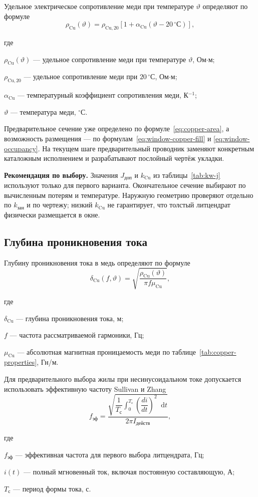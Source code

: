 \documentclass[14pt,a4paper]{extarticle}
\newcommand{\recommend}{\par\noindent\textbf{Рекомендация по выбору.} }
\newcommand{\dd}{\mathop{}\!\mathrm{d}}
\newenvironment{whereblock}
 {\par\noindent где\par
  \begin{list}{}{\setlength{\leftmargin}{12.5mm}
                  \setlength{\itemindent}{-12.5mm}
                  \setlength{\itemsep}{0pt}
                  \setlength{\parsep}{0pt}
                  \setlength{\topsep}{0pt}}}
 {\end{list}}
\newcommand{\whereitem}[2]{\item[] #1 --- #2}
\begin{document}
Удельное электрическое сопротивление меди при температуре $\vartheta$
определяют по формуле
\begin{equation}
 \rho_{\text{Cu}}(\vartheta)=
 \rho_{\text{Cu},20}
 \left[1+\alpha_{\text{Cu}}(\vartheta-20\,^{\circ}\text{С})\right],
 \label{eq:rho-temperature}
\end{equation}
\begin{whereblock}
\whereitem{$\rho_{\text{Cu}}(\vartheta)$}{удельное сопротивление меди при
температуре $\vartheta$, Ом$\cdot$м;}
\whereitem{$\rho_{\text{Cu},20}$}{удельное сопротивление меди при
$20\,^{\circ}\text{С}$, Ом$\cdot$м;}
\whereitem{$\alpha_{\text{Cu}}$}{температурный коэффициент сопротивления
меди, К$^{-1}$;}
\whereitem{$\vartheta$}{температура меди, $^{\circ}\text{С}$.}
\end{whereblock}

Предварительное сечение уже определено по
формуле~\eqref{eq:copper-area}, а возможность размещения --- по
формулам~\eqref{eq:window-copper-fill} и
\eqref{eq:window-occupancy}. На текущем шаге предварительный проводник
заменяют конкретным каталожным исполнением и разрабатывают послойный
чертёж укладки.

\recommend Значения $J_{\text{доп}}$ и $k_{\text{Cu}}$ из
таблицы~\ref{tab:kw-j} используют только
для первого варианта. Окончательное сечение выбирают по вычисленным
потерям и температуре. Наружную геометрию проверяют отдельно по
$k_{\text{зан}}$ и по чертежу; низкий $k_{\text{Cu}}$ не гарантирует,
что толстый литцендрат физически размещается в окне.

\subsection{Глубина проникновения тока}

Глубину проникновения тока в медь определяют по формуле
\begin{equation}
 \delta_{\text{Cu}}(f,\vartheta)=
 \sqrt{\frac{\rho_{\text{Cu}}(\vartheta)}
 {\pi f\mu_{\text{Cu}}}},
 \label{eq:skin-depth}
\end{equation}
\begin{whereblock}
\whereitem{$\delta_{\text{Cu}}$}{глубина проникновения тока, м;}
\whereitem{$f$}{частота рассматриваемой гармоники, Гц;}
\whereitem{$\mu_{\text{Cu}}$}{абсолютная магнитная проницаемость меди по
таблице~\ref{tab:copper-properties}, Гн/м.}
\end{whereblock}

Для предварительного выбора жилы при несинусоидальном токе допускается
использовать эффективную частоту Sullivan и Zhang~\cite[приложение~A]{sullivan}
\begin{equation}
 f_{\text{эф}}=
 \frac{
 \sqrt{\dfrac{1}{T_{\text{с}}}
 \displaystyle\int_0^{T_{\text{с}}}
 \left(\dfrac{di}{dt}\right)^2\dd t}}
 {2\pi I_{\text{действ}}},
 \label{eq:effective-frequency}
\end{equation}
\begin{whereblock}
\whereitem{$f_{\text{эф}}$}{эффективная частота для первого выбора
литцендрата, Гц;}
\whereitem{$i(t)$}{полный мгновенный ток, включая постоянную составляющую,
А;}
\whereitem{$T_{\text{с}}$}{период формы тока, с.}
\end{whereblock}
\end{document}

